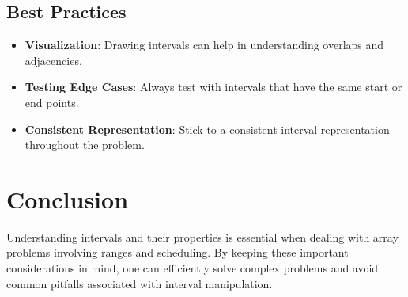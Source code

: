 \subsection{Best Practices}

\begin{itemize}
    \item \textbf{Visualization}: Drawing intervals can help in understanding overlaps and adjacencies.
    \item \textbf{Testing Edge Cases}: Always test with intervals that have the same start or end points.
    \item \textbf{Consistent Representation}: Stick to a consistent interval representation throughout the problem.
\end{itemize}

\section{Conclusion}

Understanding intervals and their properties is essential when dealing with array problems involving ranges and scheduling. By keeping these important considerations in mind, one can efficiently solve complex problems and avoid common pitfalls associated with interval manipulation.
